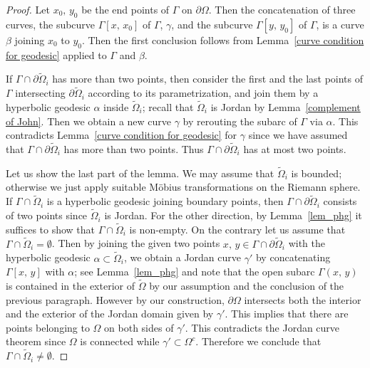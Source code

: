 \documentclass[reqno,11pt]{amsart}
\def\az{\alpha}
\def\wz{\widetilde}
\numberwithin{equation}{section}
\theoremstyle{remark}
\begin{document}
\begin{proof}
Let $x_0,\,y_0$ be the end points of $\Gamma$ on $\partial \Omega$. 
Then the concatenation of three curves, the subcurve $\Gamma[x,\,x_0]$ of $\Gamma$, $\gamma$, and the subcurve $\Gamma[y,\,y_0]$ of $\Gamma$, is a curve $\beta$ joining $x_0$ to $y_0$. Then the first conclusion follows from Lemma~\ref{curve condition for geodesic} applied to $\Gamma$ and $\beta$. 

If $\Gamma\cap \partial \wz\Omega_i$ has more than two points, then consider the first  and the last points of $\Gamma$ intersecting $\partial \wz\Omega_i$ according to its parametrization, and join them by a hyperbolic geodesic $\az$ inside $\wz\Omega_i$; recall that $\wz \Omega_i$ is Jordan by Lemma~\ref{complement of John}. Then we obtain a new curve $\gamma$ by rerouting the subarc of $\Gamma$ via $\az$. This contradicts Lemma~\ref{curve condition for geodesic} for $\gamma$ since we  have assumed that $\Gamma\cap \partial \wz\Omega_i$ has more than two points. Thus $\Gamma\cap \partial \wz\Omega_i$ has at most two points. 

Let us show the last part of the lemma. We may assume that $\wz\Omega_i$ is bounded; otherwise we just apply suitable M\"obius transformations on the Riemann sphere. 
If $\Gamma \cap \wz\Omega_i$ is a hyperbolic geodesic  joining boundary points, then $\Gamma\cap \partial \wz\Omega_i$ consists of two points since $\wz \Omega_i$ is Jordan. For the other direction, by Lemma~\ref{lem_phg} it suffices to show that $\Gamma\cap  \wz\Omega_i$ is non-empty. On the contrary let us assume that $\Gamma\cap \wz\Omega_i=\emptyset$. Then by joining the given two points  $x,\,y\in \Gamma\cap \partial \wz\Omega_i$  with the hyperbolic geodesic $\az \subset \wz\Omega_i$, we obtain a Jordan curve $\gamma'$ by concatenating $\Gamma[x,\,y]$ with $\az$; see Lemma~\ref{lem_phg} and note that the open subarc $\Gamma(x,\,y)$ is contained in the exterior of $\wz \Omega$ by our assumption and the conclusion of the previous paragraph. However by our construction, $\partial \Omega$ intersects both the interior and the exterior of the Jordan domain  given by $\gamma'$. This implies that there are points belonging to $\Omega$ on both sides of $\gamma'$. This contradicts the Jordan curve theorem since $\Omega$ is connected while $\gamma'\subset \Omega^c$. Therefore we conclude that $\Gamma\cap \wz\Omega_i\neq \emptyset$.  
\end{proof}
\end{document}
